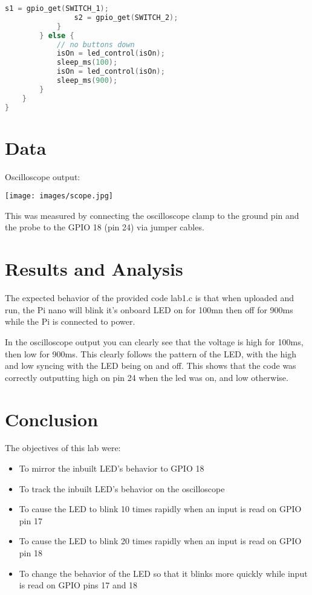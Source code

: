 \documentclass[sigconf]{article}
\begin{document}
\begin{lstlisting}[language=c,frame=single,breaklines]
                s1 = gpio_get(SWITCH_1);
                s2 = gpio_get(SWITCH_2);
            }
        } else {
            // no buttons down
            isOn = led_control(isOn);
            sleep_ms(100);
            isOn = led_control(isOn);
            sleep_ms(900);
        }
    }
}

\end{lstlisting}

\clearpage
\section{Data}

Oscilloscope output:

\texttt{[image: images/scope.jpg]}

This was measured by connecting the oscilloscope clamp to the ground pin and the probe to the GPIO 18 (pin 24) via jumper cables. 

\clearpage
\section{Results and Analysis}

The expected behavior of the provided code lab1.c is that when uploaded and run, the Pi nano will blink it's onboard LED on for 100mn then off for 900ms while the Pi is connected to power.

In the oscilloscope output you can clearly see that the voltage is high for 100ms, then low for 900ms. This clearly follows the pattern of the LED, with the high and low syncing with the LED being on and off. This shows that the code was correctly outputting high on pin 24 when the led was on, and low otherwise.


\section{Conclusion}

The objectives of this lab were:

\begin{itemize}
  \item To mirror the inbuilt LED's behavior to GPIO 18
  \item To track the inbuilt LED's behavior on the oscilloscope
  \item To cause the LED to blink 10 times rapidly when an input is read on GPIO pin 17
  \item To cause the LED to blink 20 times rapidly when an input is read on GPIO pin 18
  \item To change the behavior of the LED so that it blinks more quickly while input is read on GPIO pins 17 and 18
\end{itemize}
\end{document}
